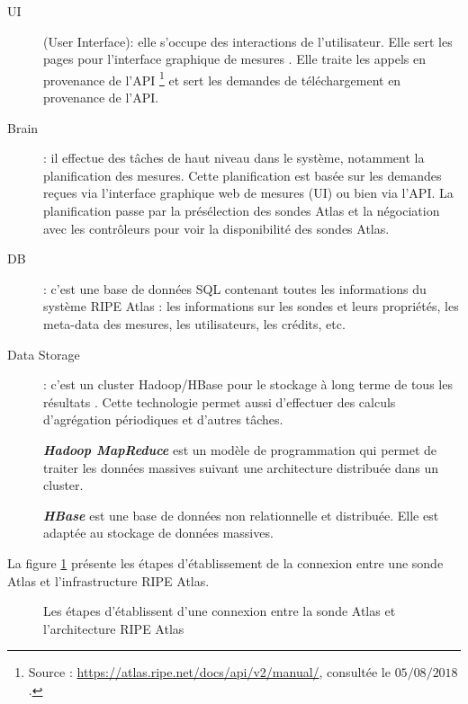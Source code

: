 \begin{description}
	
	
	\item [UI] (User Interface): elle s'occupe des interactions de l'utilisateur. Elle sert les pages pour l'interface graphique de mesures \cite{create-UDM}. Elle traite les appels en provenance de l'API \footnote{Source : \url{https://atlas.ripe.net/docs/api/v2/manual/}, consultée le $05/08/2018$.} et sert les demandes de téléchargement en provenance de l'API.
	
	\item [Brain] : il effectue des tâches de haut niveau dans le système, notamment la planification des mesures. Cette planification est basée sur les demandes reçues via l'interface graphique web de mesures (UI) ou bien via l'API. La planification passe par la  présélection des sondes Atlas et la négociation avec les contrôleurs pour voir la disponibilité des sondes Atlas. 
	
	
	\item [DB] : c'est une base de données SQL contenant toutes les informations du système RIPE Atlas : les informations sur les sondes et leurs propriétés, les meta-data des mesures, les utilisateurs, les crédits, etc. 
	
	\item [Data Storage] : c'est un cluster Hadoop/HBase pour le stockage à long terme de tous les résultats . Cette technologie permet aussi d'effectuer des calculs d'agrégation périodiques et  d'autres tâches. 
	
	
	\begin{tcolorbox}
		\textbf{\textit{Hadoop MapReduce}} est un modèle de programmation qui permet de traiter les données massives suivant une architecture distribuée dans un cluster.
		
		\textbf{\textit{HBase}} est une base de données non relationnelle et distribuée. Elle est adaptée au stockage de données massives.
	\end{tcolorbox} 
	
\end{description}


La figure \ref{fig:deroulement-connexion-ripe-atlas} présente les étapes d'établissement de la connexion entre une sonde Atlas  et  l'infrastructure RIPE Atlas.

\begin{figure}[H]
	\captionsetup{justification=centering}
	\centering
	\resizebox{\textwidth}{7 cm}{
		 
	}
	\caption{Les étapes d'établissent d'une connexion entre la sonde Atlas et l'architecture  RIPE Atlas}
	\label{fig:deroulement-connexion-ripe-atlas}
\end{figure}


